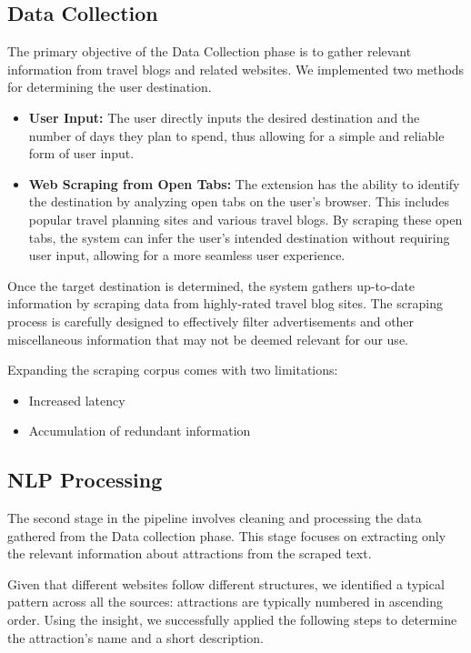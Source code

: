 \documentclass[final,1p,times]{elsarticle}
\begin{document}
    \subsection{Data Collection}
        The primary objective of the Data Collection phase is to gather relevant information from travel blogs and related websites. We implemented two methods for determining the user destination.
        
        \begin{itemize}
            \item \textbf{User Input:} The user directly inputs the desired destination and the number of days they plan to spend, thus allowing for a simple and reliable form of user input.
            
            \item \textbf{Web Scraping from Open Tabs:} The extension has
            the ability to identify the destination by analyzing open tabs on the user’s browser. This includes popular travel planning sites and various travel blogs. By scraping these open tabs, the system can infer the user’s intended destination without requiring user input, allowing for a more seamless user experience.
        \end{itemize}
        
        Once the target destination is determined, the system gathers up-to-date information by scraping data from highly-rated travel blog sites. The scraping process is carefully designed to effectively filter advertisements and other miscellaneous information that may not be deemed relevant for our use.
        
        Expanding the scraping corpus comes with two limitations:
        \begin{itemize}
            \item Increased latency
            \item Accumulation of redundant information
        \end{itemize}
    
    \subsection{NLP Processing}
        The second stage in the pipeline involves cleaning and processing the data gathered from the Data collection phase. This stage focuses on extracting only the relevant information about attractions from the scraped text.
        
        Given that different websites follow different structures, we identified a typical pattern across all the sources: attractions are typically numbered in ascending order. Using the insight, we successfully applied the following steps to determine the attraction's name and a short description.
        
\end{document}
